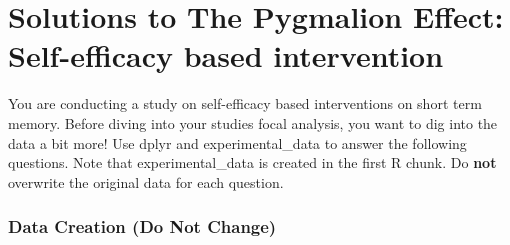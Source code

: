 \documentclass[]{book}
\theoremstyle{definition}
\theoremstyle{definition}
\theoremstyle{definition}
\theoremstyle{remark}
\begin{document}
\hypertarget{solutions-to-the-pygmalion-effect-self-efficacy-based-intervention}{%
\chapter{Solutions to The Pygmalion Effect: Self-efficacy based intervention}\label{solutions-to-the-pygmalion-effect-self-efficacy-based-intervention}}

You are conducting a study on self-efficacy based interventions on short term memory. Before diving into your studies focal analysis, you want to dig into the data a bit more! Use dplyr and experimental\_data to answer the following questions. Note that experimental\_data is created in the first R chunk. Do \textbf{not} overwrite the original data for each question.

\hypertarget{data-creation-do-not-change-1}{%
\subsection{Data Creation (Do Not Change)}\label{data-creation-do-not-change-1}}
\end{document}
